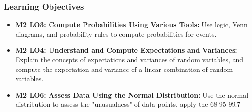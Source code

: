 \begin{frame}
    \frametitle{Learning Objectives}
    \begin{itemize}
        \item \textbf{M2 LO3: Compute Probabilities Using Various Tools:} Use logic, Venn diagrams, and probability rules to compute probabilities for events.
        \item \textbf{M2 LO4: Understand and Compute Expectations and Variances:} Explain the concepts of expectations and variances of random variables, and compute the expectation and variance of a linear combination of random variables.
        \item \textbf{M2 LO6: Assess Data Using the Normal Distribution:} Use the normal distribution to assess the "unusualness" of data points, apply the 68-95-99.7%
    \end{itemize}
\end{frame}
